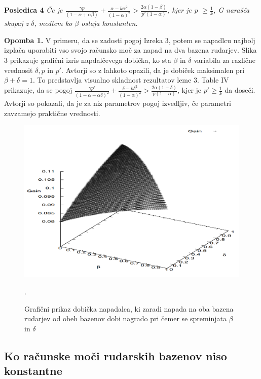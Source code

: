 \documentclass{acm_proc_article-sp}
\begin{document}
\newline
\newline
\textbf{Posledica 4} \textit{Če je $\frac{\gamma p}{(1 - \alpha + \alpha\beta)} + \frac{\alpha - k\alpha^2}{(1 - \alpha)^2} > \frac{2\alpha(1 - \beta)}{p' (1 - \alpha)}$, kjer je p $\geq \frac{1}{k}$, G narašča skupaj z $\delta$, medtem ko $\beta$ ostaja konstanten.}

\textbf{Opomba 1.} V primeru, da se zadosti pogoj Izreka 3, potem se napadlcu najbolj izplača uporabiti vso svojo računsko moč za napad na dva bazena rudarjev. Slika 3 prikazuje grafični izris napdalčevega dobička, ko sta $\beta$ in $\delta$ variabila za različne vrednosit $\delta, p $ in $p'$. Avtorji so z lahkoto opazili, da je dobiček maksimalen pri $\beta + \delta = 1$. To predstavlja visualno skladnost rezultatov leme 3.
\newline
\newline
Table IV prikazuje, da se pogoj $\frac{\gamma p'}{(1 - \alpha + \alpha\delta)^2} + \frac{\delta - k\delta^2}{(1 - \alpha)^2} > \frac{2\alpha(1 - \delta)}{p(1 - \alpha)}$, kjer je $p' \geq \frac{1}{k}$ da doseči. Avtorji so pokazali, da je za niz parametrov pogoj izvedljiv, če parametri zavzamejo praktične vrednosti. 


\begin{figure}
  \includegraphics[scale=0.25]{image8.png}
  \caption{Grafični prikaz dobička napadalca, ki zaradi napada na oba bazena rudarjev od obeh bazenov dobi nagrado pri čemer se spreminjata $\beta$ in $\delta$}.
  \label{fig:boat1}
\end{figure}


\subsection{Ko računske moči rudarskih bazenov niso konstantne} \label{sekcija5b}
\end{document}
